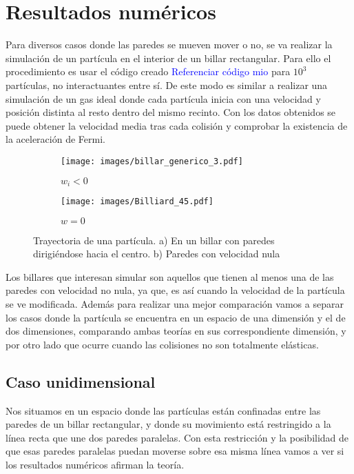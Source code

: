 \documentclass[11pt, spanish]{book}
\begin{document}
\chapter{Resultados numéricos}

Para diversos casos donde las paredes se mueven mover o no, se va realizar la simulación de un partícula en el interior de un billar rectangular. Para ello el procedimiento es usar el código creado \cite{MiCodigo} \textcolor{blue}{Referenciar código mio} para \( 10^3 \) partículas, no interactuantes entre sí. De este modo es similar a realizar una simulación de un gas ideal donde cada partícula inicia con una velocidad y posición distinta al resto dentro del mismo recinto. Con los datos obtenidos se puede obtener la velocidad media tras cada colisión y comprobar la existencia de la aceleración de Fermi.

\begin{figure}[H]
    \begin{subfigure}[b]{0.5\textwidth}
        \centering
        \texttt{[image: images/billar\_generico\_3.pdf]}
        \caption{$w_i<0$}
        \label{fig:a}
    \end{subfigure}
    \hfill
    \begin{subfigure}[b]{0.5\textwidth}
        \centering
        \texttt{[image: images/Billiard\_45.pdf]}
        \caption{$w=0$}
        \label{fig:s}
    \end{subfigure}
    \caption{Trayectoria de una partícula. a) En un billar con paredes dirigiéndose hacia el centro. b) Paredes con velocidad nula}
\end{figure}


Los billares que interesan simular son aquellos que tienen al menos una de las paredes con velocidad no nula, ya que, es así cuando la velocidad de la partícula se ve modificada. Además para realizar una mejor comparación vamos a separar los casos donde la partícula se encuentra en un espacio de una dimensión y el de dos dimensiones, comparando ambas teorías en sus correspondiente dimensión, y por otro lado que ocurre cuando las colisiones no son totalmente elásticas.

\section{Caso unidimensional}

Nos situamos en un espacio donde las partículas están confinadas entre las paredes de un billar rectangular, y donde su movimiento está restringido a la línea recta que une dos paredes paralelas. Con esta restricción y la posibilidad de que esas paredes paralelas puedan moverse sobre esa misma línea vamos a ver si los resultados numéricos afirman la teoría.
\end{document}
